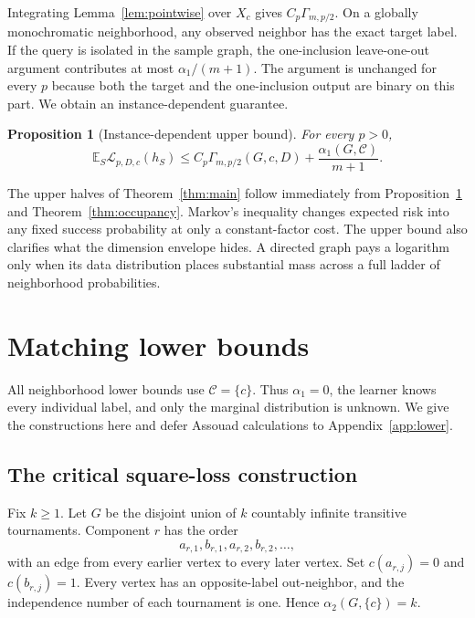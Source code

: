 \documentclass{article}
\newtheorem{proposition}[theorem]{Proposition}
\theoremstyle{definition}
\theoremstyle{remark}
\newcommand{\E}{\mathbb E}
\newcommand{\risk}{\mathcal L}
\newcommand{\cclass}{\mathcal C}
\newcommand{\gprof}{\Gamma}
\begin{document}
Integrating Lemma~\ref{lem:pointwise} over $X_c$ gives $C_p\gprof_{m,p/2}$. On a globally monochromatic neighborhood, any observed neighbor has the exact target label. If the query is isolated in the sample graph, the one-inclusion leave-one-out argument contributes at most $\alpha_1/(m+1)$. The argument is unchanged for every $p$ because both the target and the one-inclusion output are binary on this part. We obtain an instance-dependent guarantee.

\begin{proposition}[Instance-dependent upper bound]
\label{prop:instance}
For every $p>0$,
\begin{equation}
\E_S\risk_{p,D,c}(h_S)
\leq C_p\gprof_{m,p/2}(G,c,D)+\frac{\alpha_1(G,\cclass)}{m+1}. \label{eq:instance}
\end{equation}
\end{proposition}

The upper halves of Theorem~\ref{thm:main} follow immediately from Proposition~\ref{prop:instance} and Theorem~\ref{thm:occupancy}. Markov's inequality changes expected risk into any fixed success probability at only a constant-factor cost. The upper bound also clarifies what the dimension envelope hides. A directed graph pays a logarithm only when its data distribution places substantial mass across a full ladder of neighborhood probabilities.

\section{Matching lower bounds}
\label{sec:lower}

All neighborhood lower bounds use $\cclass=\{c\}$. Thus $\alpha_1=0$, the learner knows every individual label, and only the marginal distribution is unknown. We give the constructions here and defer Assouad calculations to Appendix~\ref{app:lower}.

\subsection{The critical square-loss construction}

Fix $k\geq1$. Let $G$ be the disjoint union of $k$ countably infinite transitive tournaments. Component $r$ has the order \[ a_{r,1},b_{r,1},a_{r,2},b_{r,2},\ldots, \] with an edge from every earlier vertex to every later vertex. Set $c(a_{r,j})=0$ and $c(b_{r,j})=1$. Every vertex has an opposite-label out-neighbor, and the independence number of each tournament is one. Hence $\alpha_2(G,\{c\})=k$.
\end{document}
